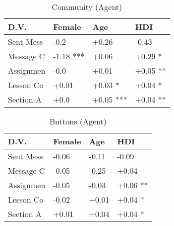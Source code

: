 \begin{table}[t]
\begin{center}
\begin{tabularx}{\columnwidth}{lXXX}
\toprule
D.V. & Female & Age & HDI \\
\midrule
Sent Mess & -0.2 & +0.26 & -0.43 \\
Message C & -1.18 *** & +0.06 & +0.29 * \\
Assignmen & -0.0 & +0.01 & +0.05 ** \\
Lesson Co & +0.01 & +0.03 * & +0.04 * \\
Section A & +0.0 & +0.05 *** & +0.04 ** \\
\bottomrule
\end{tabularx}
\end{center}
\caption{Community (Agent)}
\label{tab:demo_table}
\end{table}

\begin{table}[t]
\begin{center}
\begin{tabularx}{\columnwidth}{lXXX}
\toprule
D.V. & Female & Age & HDI \\
\midrule
Sent Mess & -0.06 & -0.11 & -0.09 \\
Message C & -0.05 & -0.25 & +0.04 \\
Assignmen & -0.05 & -0.03 & +0.06 ** \\
Lesson Co & -0.02 & +0.01 & +0.04 * \\
Section A & +0.01 & +0.04 & +0.04 * \\
\bottomrule
\end{tabularx}
\end{center}
\caption{Buttons (Agent)}
\label{tab:demo_table}
\end{table}

